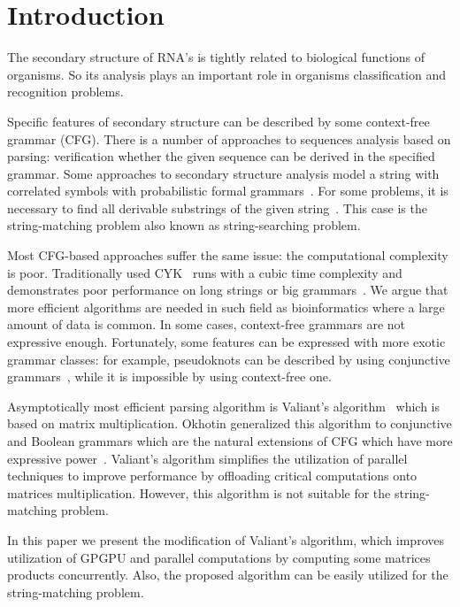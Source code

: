 \section{\bf Introduction}

The secondary structure of RNA's is tightly related to biological functions of organisms.
So its analysis plays an important role in organisms classification and recognition problems.

Specific features of secondary structure can be described by some context-free grammar (CFG).
There is a number of approaches to sequences analysis based on parsing: verification whether the given sequence can be derived in the specified grammar.
Some approaches to secondary structure analysis model a string with correlated symbols with probabilistic formal grammars~\cite{knudsen1999rna, dowell2004evaluation}.
For some problems, it is necessary to find all derivable substrings of the given string~\cite{durbin1996biological}.
This case is the string-matching problem also known as string-searching problem.

Most CFG-based approaches suffer the same issue: the computational complexity is poor.
Traditionally used CYK~\cite{kasami1966efficient, Younger:1966:CLP:1441427.1442019} runs with a cubic time complexity and demonstrates poor performance on long strings or big grammars~\cite{liu2005parallel}.
We argue that more efficient algorithms are needed in such field as bioinformatics where a large amount of data is common.
In some cases, context-free grammars are not expressive enough.
Fortunately, some features can be expressed with more exotic grammar classes:  for example, pseudoknots can be described by using conjunctive grammars~\cite{zier2013rna}, while it is impossible by using context-free one.

Asymptotically most efficient parsing algorithm is Valiant's algorithm~\cite{Valiant:1975:GCR:1739932.1740048} which is based on matrix multiplication.
Okhotin generalized this algorithm to conjunctive and Boolean grammars which are the natural extensions of CFG which have more expressive power~\cite{Okhotin:2014:PMM:2565359.2565379}.
Valiant’s algorithm simplifies the utilization of parallel techniques to improve performance by offloading critical computations onto matrices multiplication.
However, this algorithm is not suitable for the string-matching problem.

In this paper we present the modification of Valiant's algorithm, which improves utilization of GPGPU and parallel computations by computing some matrices products concurrently.
Also, the proposed algorithm can be easily utilized for the string-matching problem.
